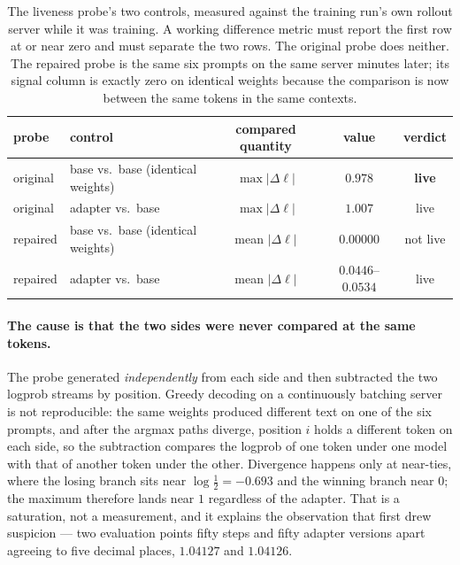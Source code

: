 \begin{table}[t]
\centering\small
\caption{The liveness probe's two controls, measured against the training run's own rollout
server while it was training. A working difference metric must report the first row at or near
zero and must separate the two rows. The original probe does neither. The repaired probe is
the same six prompts on the same server minutes later; its signal column is exactly zero on
identical weights because the comparison is now between the same tokens in the same contexts.}
\label{tab:liveness}
\begin{tabular}{llccc}
\toprule
probe & control & compared quantity & value & verdict \\
\midrule
original & base vs.\ base (identical weights) & $\max|\Delta\ell|$  & $0.978$ & \textbf{live} \\
original & adapter vs.\ base                  & $\max|\Delta\ell|$  & $1.007$ & live \\
\midrule
repaired & base vs.\ base (identical weights) & mean $|\Delta\ell|$ & $0.00000$ & not live \\
repaired & adapter vs.\ base                  & mean $|\Delta\ell|$ & $0.0446$--$0.0534$ & live \\
\bottomrule
\end{tabular}
\end{table}

\paragraph{The cause is that the two sides were never compared at the same tokens.} The probe
generated \emph{independently} from each side and then subtracted the two logprob streams by
position. Greedy decoding on a continuously batching server is not reproducible: the same
weights produced different text on one of the six prompts, and after the argmax paths diverge,
position $i$ holds a different token on each side, so the subtraction compares the logprob of
one token under one model with that of another token under the other. Divergence happens only
at near-ties, where the losing branch sits near $\log \tfrac12 = -0.693$ and the winning branch
near $0$; the maximum therefore lands near $1$ regardless of the adapter. That is a saturation,
not a measurement, and it explains the observation that first drew suspicion --- two evaluation
points fifty steps and fifty adapter versions apart agreeing to five decimal places,
$1.04127$ and $1.04126$.

